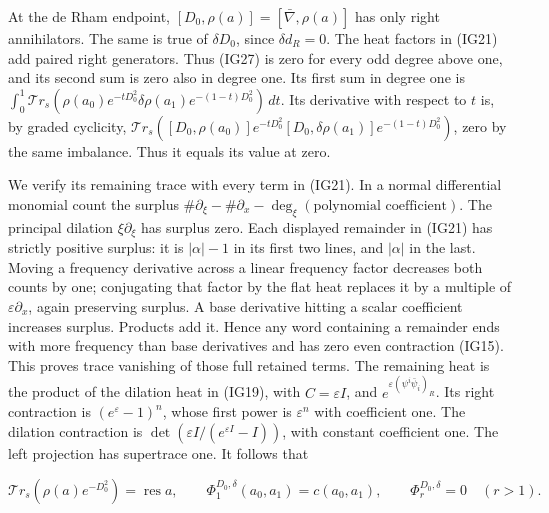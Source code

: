 \documentclass[
  11pt,
]{article}
\begin{document}
At the de Rham endpoint, \([D_0,\rho(a)]=[\bar\nabla,\rho(a)]\) has only
right annihilators. The same is true of \(\delta D_0\), since
\(\delta d_R=0\). The heat factors in (IG21) add paired right
generators. Thus (IG27) is zero for every odd degree above one, and its
second sum is zero also in degree one. Its first sum in degree one is
\(\int_0^1\mathcal{T}r_s(\rho(a_0)e^{-tD_0^2}\delta\rho(a_1)e^{-(1-t)D_0^2})\,dt\).
Its derivative with respect to \(t\) is, by graded cyclicity,
\(\mathcal{T}r_s([D_0,\rho(a_0)]e^{-tD_0^2}[D_0,\delta\rho(a_1)]e^{-(1-t)D_0^2})\),
zero by the same imbalance. Thus it equals its value at zero.

We verify its remaining trace with every term in (IG21). In a normal
differential monomial count the surplus
\(\#\partial_\xi-\#\partial_x-\deg_\xi(\text{polynomial coefficient})\).
The principal dilation \(\xi\partial_\xi\) has surplus zero. Each
displayed remainder in (IG21) has strictly positive surplus: it is
\(|\alpha|-1\) in its first two lines, and \(|\alpha|\) in the last.
Moving a frequency derivative across a linear frequency factor decreases
both counts by one; conjugating that factor by the flat heat replaces it
by a multiple of \(\varepsilon\partial_x\), again preserving surplus. A
base derivative hitting a scalar coefficient increases surplus. Products
add it. Hence any word containing a remainder ends with more frequency
than base derivatives and has zero even contraction (IG15). This proves
trace vanishing of those full retained terms. The remaining heat is the
product of the dilation heat in (IG19), with \(C=\varepsilon I\), and
\(e^{\varepsilon(\psi^i\bar\psi_i)_R}\). Its right contraction is
\((e^\varepsilon-1)^n\), whose first power is \(\varepsilon^n\) with
coefficient one. The dilation contraction is
\(\det(\varepsilon I/(e^{\varepsilon I}-I))\), with constant coefficient
one. The left projection has supertrace one. It follows that

\[
 \mathcal{T}r_s(\rho(a)e^{-D_0^2})=\operatorname{res}a,
 \qquad \Phi_1^{D_0,\delta}(a_0,a_1)=c(a_0,a_1),
 \qquad \Phi_r^{D_0,\delta}=0\quad(r>1).
\tag{IG28}
\]
\end{document}
